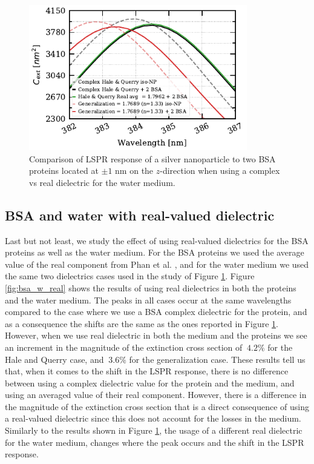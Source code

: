  \begin{figure} %
    \centering
    \includegraphics[width=0.85\textwidth]{bsa_w_real_water_diel.pdf} 
    \caption{Comparison of LSPR response of a silver nanoparticle to two BSA proteins located at $\pm1$ nm on the $z$-direction
    when using a complex vs real dielectric for the water medium.}
    \label{fig:real_w_comp_bsa}
 \end{figure}

 \subsection{BSA and water with real-valued dielectric}

Last but not least, we study the effect of using real-valued dielectrics for the BSA proteins as well as the water medium. For the BSA proteins 
we used the average value of the real component from Phan et al. \cite{PhanETal2013}, and for the water medium we used the same two dielectrics cases
used in the study of Figure \ref{fig:real_w_comp_bsa}. Figure \ref{fig:bsa_w_real} shows the results of using real dielectrics in both the proteins and
the water medium. The peaks in all cases occur at the same wavelengths compared to the case where we use a BSA complex dielectric for the protein, and as a 
consequence the shifts are the same as the ones reported in Figure \ref{fig:real_w_comp_bsa}. However, when we use real dielectric in both the medium 
and the proteins we see an increment in the magnitude of the extinction cross section of $~4.2\%$ for the Hale and Querry case, and $~3.6\%$ for the 
generalization case. These results tell us that, when it comes to the shift in the LSPR response, there is no difference between using a complex dielectric 
value for the protein and the medium, and using an averaged value of their real component. However, there is a difference in the magnitude of the 
extinction cross section that is a direct consequence of using a real-valued dielectric since this does not account for the losses in the medium. Similarly to the 
results shown in Figure \ref{fig:real_w_comp_bsa}, the usage of a different real dielectric for the water medium, changes where the peak occurs and the shift in the 
LSPR response. 

